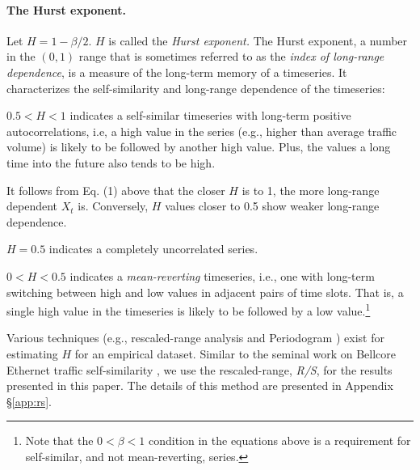 \paragraph{The Hurst exponent.} Let $H=1-\beta/2.$ $H$ is called the \emph{Hurst exponent.} The Hurst exponent, a number in the $(0,1)$ range that is sometimes referred to as the \emph{index of long-range dependence}, is a measure of the long-term memory of a timeseries. It characterizes the self-similarity and long-range dependence of the timeseries: 
\begin{compactitem}
\item{\underline{$0.5<H<1$} indicates a self-similar timeseries with long-term positive autocorrelations, i.e, a high value in the series (e.g., higher than average traffic volume) is likely to be followed by another high value. Plus, the values a long time into the future also tends to be high.

It follows from Eq. (1) above that the closer $H$ is to 1, the more long-range dependent $X_t$ is. Conversely, $H$ values closer to 0.5 show weaker long-range dependence.
}
%
\item{\underline{$H=0.5$} indicates a completely uncorrelated series.}
%
\item{\underline{$0<H<0.5$} indicates a \emph{mean-reverting} timeseries, i.e., one with long-term switching between high and low values in adjacent pairs of time slots. That is, a single high value in the timeseries is likely to be followed by a low value.\footnote{Note that the $0<\beta<1$ condition in the equations above is a requirement for self-similar, and not mean-reverting, series.}
}
\end{compactitem}

Various techniques (e.g., rescaled-range analysis and Periodogram \cite{hurst-comp}) exist for estimating $H$ for an empirical dataset. Similar to the seminal work on Bellcore Ethernet traffic self-similarity \cite{selfsim}, we use the rescaled-range, \emph{R/S}, for the results presented in this paper. The details of this method are presented in Appendix \S\ref{app:rs}.

